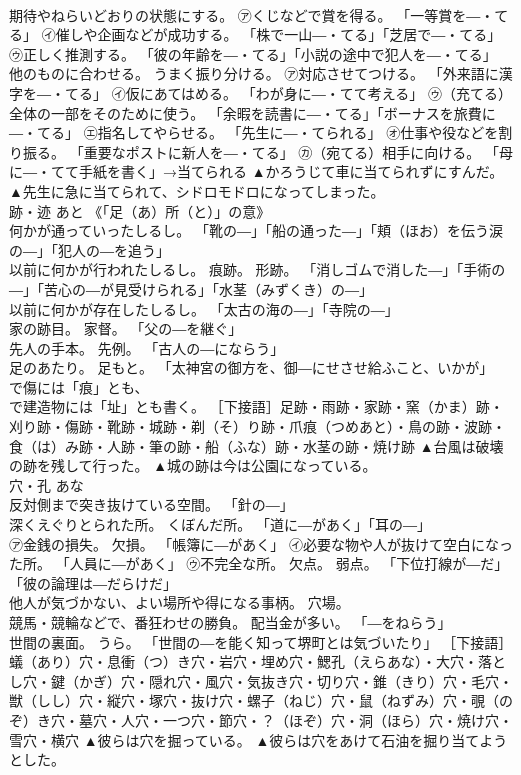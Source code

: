 \documentclass[8pt]{extreport}
\begin{document}
\begin{CJK}{UTF8}{min}
\\	期待やねらいどおりの状態にする。 ㋐くじなどで賞を得る。 「一等賞を―・てる」 ㋑催しや企画などが成功する。 「株で一山―・てる」「芝居で―・てる」 ㋒正しく推測する。 「彼の年齢を―・てる」「小説の途中で犯人を―・てる」 
\\	他のものに合わせる。 うまく振り分ける。 ㋐対応させてつける。 「外来語に漢字を―・てる」 ㋑仮にあてはめる。 「わが身に―・てて考える」 ㋒（充てる）全体の一部をそのために使う。 「余暇を読書に―・てる」「ボーナスを旅費に―・てる」 ㋓指名してやらせる。 「先生に―・てられる」 ㋔仕事や役などを割り振る。 「重要なポストに新人を―・てる」 ㋕（宛てる）相手に向ける。 「母に―・てて手紙を書く」→当てられる	▲かろうじて車に当てられずにすんだ。 ▲先生に急に当てられて、シドロモドロになってしまった。
\\	跡・迹	あと	《「足（あ）所（と）」の意》 
\\	何かが通っていったしるし。 「靴の―」「船の通った―」「頬（ほお）を伝う涙の―」「犯人の―を追う」 
\\	以前に何かが行われたしるし。 痕跡。 形跡。 「消しゴムで消した―」「手術の―」「苦心の―が見受けられる」「水茎（みずくき）の―」 
\\	以前に何かが存在したしるし。 「太古の海の―」「寺院の―」 
\\	家の跡目。 家督。 「父の―を継ぐ」 
\\	先人の手本。 先例。 「古人の―にならう」 
\\	足のあたり。 足もと。 「太神宮の御方を、御―にせさせ給ふこと、いかが」 
\\	で傷には「痕」とも、 
\\	で建造物には「址」とも書く。 ［下接語］足跡・雨跡・家跡・窯（かま）跡・刈り跡・傷跡・靴跡・城跡・剃（そ）り跡・爪痕（つめあと）・鳥の跡・波跡・食（は）み跡・人跡・筆の跡・船（ふな）跡・水茎の跡・焼け跡	▲台風は破壊の跡を残して行った。 ▲城の跡は今は公園になっている。
\\	穴・孔	あな	
\\	反対側まで突き抜けている空間。 「針の―」 
\\	深くえぐりとられた所。 くぼんだ所。 「道に―があく」「耳の―」 
\\	㋐金銭の損失。 欠損。 「帳簿に―があく」 ㋑必要な物や人が抜けて空白になった所。 「人員に―があく」 ㋒不完全な所。 欠点。 弱点。 「下位打線が―だ」「彼の論理は―だらけだ」 
\\	他人が気づかない、よい場所や得になる事柄。 穴場。 
\\	競馬・競輪などで、番狂わせの勝負。 配当金が多い。 「―をねらう」 
\\	世間の裏面。 うら。 「世間の―を能く知って堺町とは気づいたり」 ［下接語］蟻（あり）穴・息衝（つ）き穴・岩穴・埋め穴・鰓孔（えらあな）・大穴・落とし穴・鍵（かぎ）穴・隠れ穴・風穴・気抜き穴・切り穴・錐（きり）穴・毛穴・獣（しし）穴・縦穴・塚穴・抜け穴・螺子（ねじ）穴・鼠（ねずみ）穴・覗（のぞ）き穴・墓穴・人穴・一つ穴・節穴・？（ほぞ）穴・洞（ほら）穴・焼け穴・雪穴・横穴	▲彼らは穴を掘っている。 ▲彼らは穴をあけて石油を掘り当てようとした。

\end{CJK}
\end{document}
